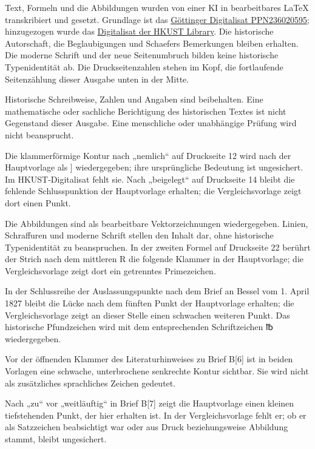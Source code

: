 Text, Formeln und die Abbildungen wurden von einer KI in bearbeitbares LaTeX transkribiert und gesetzt. Grundlage ist das \href{https://gdz.sub.uni-goettingen.de/id/PPN236020595}{Göttinger Digitalisat PPN236020595}; hinzugezogen wurde das \href{https://lbezone.hkust.edu.hk/obj/4/o/b761099/v11,1/pg00011.jpg}{Digitalisat der HKUST Library}. Die historische Autorschaft, die Beglaubigungen und Schaefers Bemerkungen bleiben erhalten. Die moderne Schrift und der neue Seitenumbruch bilden keine historische Typenidentität ab. Die Druckseitenzahlen stehen im Kopf, die fortlaufende Seitenzählung dieser Ausgabe unten in der Mitte.

Historische Schreibweise, Zahlen und Angaben sind beibehalten. Eine mathematische oder sachliche Berichtigung des historischen Textes ist nicht Gegenstand dieser Ausgabe. Eine menschliche oder unabhängige Prüfung wird nicht beansprucht.

Die klammerförmige Kontur nach „nemlich“ auf Druckseite 12 wird nach der Hauptvorlage als ] wiedergegeben; ihre ursprüngliche Bedeutung ist ungesichert. Im HKUST-Digitalisat fehlt sie. Nach „beigelegt“ auf Druckseite 14 bleibt die fehlende Schlusspunktion der Hauptvorlage erhalten; die Vergleichsvorlage zeigt dort einen Punkt.

Die Abbildungen sind als bearbeitbare Vektorzeichnungen wiedergegeben. Linien, Schraffuren und moderne Schrift stellen den Inhalt dar, ohne historische Typenidentität zu beanspruchen. In der zweiten Formel auf Druckseite 22 berührt der Strich nach dem mittleren R die folgende Klammer in der Hauptvorlage; die Vergleichsvorlage zeigt dort ein getrenntes Primezeichen.

In der Schlussreihe der Auslassungspunkte nach dem Brief an Bessel vom 1. April 1827 bleibt die Lücke nach dem fünften Punkt der Hauptvorlage erhalten; die Vergleichsvorlage zeigt an dieser Stelle einen schwachen weiteren Punkt. Das historische Pfundzeichen wird mit dem entsprechenden Schriftzeichen {℔} wiedergegeben.

Vor der öffnenden Klammer des Literaturhinweises zu Brief B[6] ist in beiden Vorlagen eine schwache, unterbrochene senkrechte Kontur sichtbar. Sie wird nicht als zusätzliches sprachliches Zeichen gedeutet.

Nach „zu“ vor „weitläuftig“ in Brief B[7] zeigt die Hauptvorlage einen kleinen tiefstehenden Punkt, der hier erhalten ist. In der Vergleichsvorlage fehlt er; ob er als Satzzeichen beabsichtigt war oder aus Druck beziehungsweise Abbildung stammt, bleibt ungesichert.

